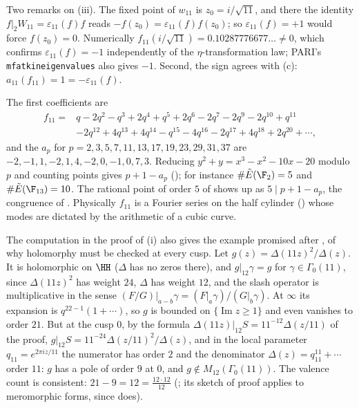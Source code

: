Two remarks on (iii). The fixed point of $w_{11}$ is $z_0=i/\sqrt{11}$, and there the identity $f|_2W_{11}=\varepsilon_{11}(f)f$ reads $-f(z_0)=\varepsilon_{11}(f)f(z_0)$; so $\varepsilon_{11}(f)=+1$ would force $f(z_0)=0$.
Numerically $f_{11}(i/\sqrt{11})=0.10287776677\ldots\ne0$, which confirms $\varepsilon_{11}(f)=-1$ independently of the $\eta$-transformation law; PARI's \texttt{mfatkineigenvalues} also gives
$-1$. Second, the sign agrees with (c): $a_{11}(f_{11})=1=-\varepsilon_{11}(f)$.

The first coefficients are
\[
\begin{aligned}
f_{11}={}&q-2q^2-q^3+2q^4+q^5+2q^6-2q^7-2q^9-2q^{10}+q^{11}\\
&-2q^{12}+4q^{13}+4q^{14}-q^{15}-4q^{16}-2q^{17}+4q^{18}+2q^{20}+\cdots,
\end{aligned}
\]
and the $a_p$ for $p=2,3,5,7,11,13,17,19,23,29,31,37$ are $-2,-1,1,-2,1,4,-2,0,-1,0,7,3$. Reducing $y^2+y=x^3-x^2-10x-20$ modulo $p$ and counting points gives $p+1-a_p$
(); for instance $\#\tilde E(\F_2)=5$ and $\#\tilde E(\F_{13})=10$. The rational point of order $5$ of  shows up as $5\mid p+1-a_p$, the congruence of
. Physically $f_{11}$ is a Fourier series on the half cylinder () whose modes are dictated by the arithmetic of
a cubic curve.

The computation in the proof of (i) also gives the example promised after , of why holomorphy must be checked at every cusp. Let
$g(z)=\Delta(11z)^2/\Delta(z)$. It is holomorphic on $\HH$ ($\Delta$ has no zeros there), and $g|_{12}\gamma=g$ for $\gamma\in\Gamma_0(11)$, since $\Delta(11z)^2$ has weight $24$, $\Delta$ has
weight $12$, and the slash operator is multiplicative in the sense $(F/G)|_{a-b}\gamma=(F|_a\gamma)/(G|_b\gamma)$. At $\infty$ its expansion is $q^{22-1}(1+\cdots)$, so $g$ is bounded on
$\{\operatorname{Im}z\ge1\}$ and even vanishes to order $21$. But at the cusp $0$, by the formula $\Delta(11z)|_{12}S=11^{-12}\Delta(z/11)$ of the proof,
$g|_{12}S=11^{-24}\Delta(z/11)^2/\Delta(z)$, and in the local parameter $q_{11}=e^{2\pi iz/11}$ the numerator has order $2$ and the denominator $\Delta(z)=q_{11}^{11}+\cdots$ order $11$: $g$ has a pole
of order $9$ at $0$, and $g\notin M_{12}(\Gamma_0(11))$. The valence count is consistent: $21-9=12=\frac{12\cdot12}{12}$ (; its sketch of proof applies to meromorphic forms, since  does).

